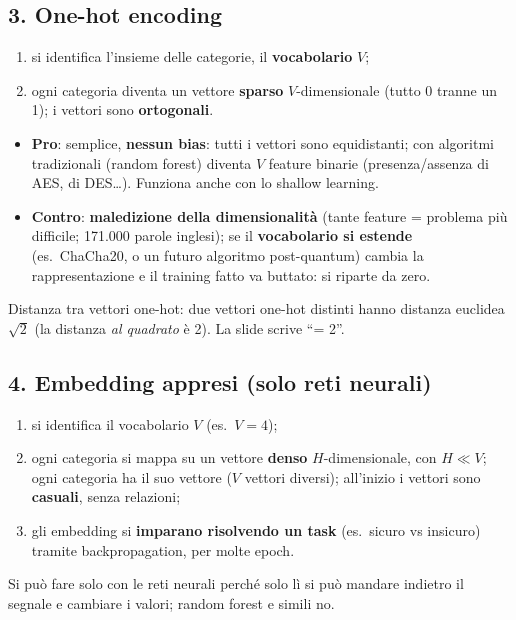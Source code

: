 \subsection{3. One-hot encoding}
\begin{enumerate}
  \item si identifica l'insieme delle categorie, il \textbf{vocabolario} $V$;
  \item ogni categoria diventa un vettore \textbf{sparso} $V$-dimensionale (tutto 0 tranne un 1); i vettori sono \textbf{ortogonali}.
\end{enumerate}
\begin{itemize}
  \item \textbf{Pro}: semplice, \textbf{nessun bias}: tutti i vettori sono equidistanti; con algoritmi tradizionali (random forest) diventa
        $V$ feature binarie (presenza/assenza di AES, di DES\ldots). Funziona anche con lo shallow learning.
  \item \textbf{Contro}: \textbf{maledizione della dimensionalità} (tante feature = problema più difficile; 171.000 parole inglesi);
        se il \textbf{vocabolario si estende} (es.\ ChaCha20, o un futuro algoritmo post-quantum) cambia la rappresentazione e il training fatto
        va buttato: si riparte da zero.
\end{itemize}
\begin{verifica}
Distanza tra vettori one-hot: due vettori one-hot distinti hanno distanza euclidea $\sqrt{2}$ (la distanza \emph{al quadrato} è 2).
La slide scrive ``= 2''.
\end{verifica}

\subsection{4. Embedding appresi (solo reti neurali)}
\begin{enumerate}
  \item si identifica il vocabolario $V$ (es.\ $V=4$);
  \item ogni categoria si mappa su un vettore \textbf{denso} $H$-dimensionale, con $H \ll V$; ogni categoria ha il suo vettore
        ($V$ vettori diversi); all'inizio i vettori sono \textbf{casuali}, senza relazioni;
  \item gli embedding si \textbf{imparano risolvendo un task} (es.\ sicuro vs insicuro) tramite backpropagation, per molte epoch.
\end{enumerate}
Si può fare solo con le reti neurali perché solo lì si può mandare indietro il segnale e cambiare i valori; random forest e simili no.

